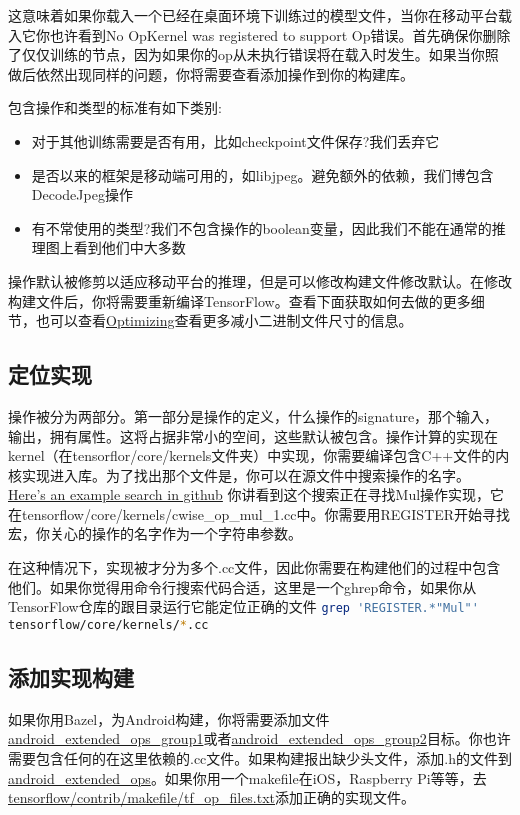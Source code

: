 这意味着如果你载入一个已经在桌面环境下训练过的模型文件，当你在移动平台载入它你也许看到No OpKernel was  registered to support Op错误。首先确保你删除了仅仅训练的节点，因为如果你的op从未执行错误将在载入时发生。如果当你照做后依然出现同样的问题，你将需要查看添加操作到你的构建库。

包含操作和类型的标准有如下类别:
\begin{itemize}
	\item 对于其他训练需要是否有用，比如checkpoint文件保存?我们丢弃它
	\item 是否以来的框架是移动端可用的，如libjpeg。避免额外的依赖，我们博包含DecodeJpeg操作
	\item 有不常使用的类型?我们不包含操作的boolean变量，因此我们不能在通常的推理图上看到他们中大多数
\end{itemize}
操作默认被修剪以适应移动平台的推理，但是可以修改构建文件修改默认。在修改构建文件后，你将需要重新编译TensorFlow。查看下面获取如何去做的更多细节，也可以查看\href{https://www.tensorflow.org/mobile/optimizing?hl=zh-cn#binary_size}{Optimizing}查看更多减小二进制文件尺寸的信息。
\subsection{定位实现}
操作被分为两部分。第一部分是操作的定义，什么操作的signature，那个输入，输出，拥有属性。这将占据非常小的空间，这些默认被包含。操作计算的实现在kernel（在tensorflor/core/kernels文件夹）中实现，你需要编译包含C++文件的内核实现进入库。为了找出那个文件是，你可以在源文件中搜索操作的名字。
\href{https://github.com/search?utf8=%E2%9C%93&q=repo%3Atensorflow%2Ftensorflow+extension%3Acc+path%3Atensorflow%2Fcore%2Fkernels+REGISTER+Mul&type=Code&ref=searchresults}{Here’s an example search in github}
你讲看到这个搜索正在寻找Mul操作实现，它在tensorflow/core/kernels/cwise\_op\_mul\_1.cc中。你需要用REGISTER开始寻找宏，你关心的操作的名字作为一个字符串参数。

在这种情况下，实现被才分为多个.cc文件，因此你需要在构建他们的过程中包含他们。如果你觉得用命令行搜索代码合适，这里是一个ghrep命令，如果你从TensorFlow仓库的跟目录运行它能定位正确的文件
\lstinline[language=Bash]{grep 'REGISTER.*"Mul"' tensorflow/core/kernels/*.cc}
\subsection{添加实现构建}
如果你用Bazel，为Android构建，你将需要添加文件\href{https://www.github.com/tensorflow/tensorflow/blob/r1.4/tensorflow/core/kernels/BUILD#L3565}{android\_extended\_ops\_group1}或者\href{https://www.github.com/tensorflow/tensorflow/blob/r1.4/tensorflow/core/kernels/BUILD#L3632}{android\_extended\_ops\_group2}目标。你也许需要包含任何的在这里依赖的.cc文件。如果构建报出缺少头文件，添加.h的文件到\href{https://www.github.com/tensorflow/tensorflow/blob/r1.4/tensorflow/core/kernels/BUILD#L3525}{android\_extended\_ops}。如果你用一个makefile在iOS，Raspberry Pi等等，去\href{https://www.github.com/tensorflow/tensorflow/blob/r1.4/tensorflow/contrib/makefile/tf_op_files.txt}{tensorflow/contrib/makefile/tf\_op\_files.txt}添加正确的实现文件。
